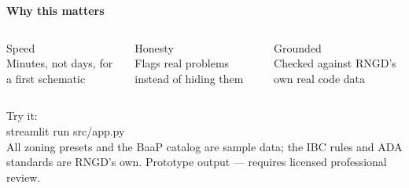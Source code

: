 \documentclass[9pt,aspectratio=169]{beamer}
\begin{document}
{%
\begin{frame}[plain]
\begin{center}
\vspace{1.1cm}
{\color{paper}\Large\bfseries Why this matters}\\[0.5cm]
\end{center}
\begin{columns}[T]
\begin{center}
\color{amber}\large Speed\\[2pt]
\color{paper!80}\footnotesize Minutes, not days, for a first schematic
\end{center}
\begin{center}
\color{amber}\large Honesty\\[2pt]
\color{paper!80}\footnotesize Flags real problems instead of hiding them
\end{center}
\begin{center}
\color{amber}\large Grounded\\[2pt]
\color{paper!80}\footnotesize Checked against RNGD's own real code data
\end{center}
\end{columns}
\vspace{0.9cm}
\begin{center}
{\color{paper!70}\normalsize Try it:}\\[3pt]
{\color{paper}\ttfamily\small streamlit run src/app.py}\\[1cm]
{\color{paper!50}\footnotesize All zoning presets and the BaaP catalog are sample data; the IBC rules and ADA standards are RNGD's own. Prototype output --- requires licensed professional review.}
\end{center}
\end{frame}
}
\end{document}
